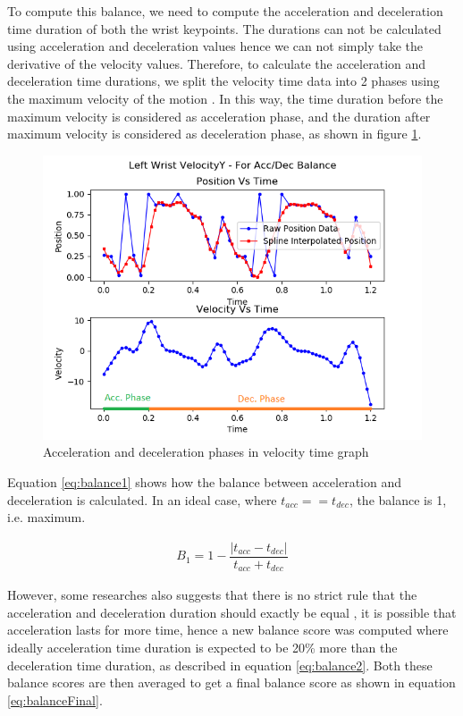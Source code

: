 To compute this balance, we need to compute the acceleration and deceleration time duration of both the wrist keypoints. The durations can not be calculated using acceleration and deceleration values hence we can not simply take the derivative of the velocity values. Therefore, to calculate the acceleration and deceleration time durations, we split the velocity time data into 2 phases using the maximum velocity of the motion \cite{scoringMultimodal}. In this way, the time duration before the maximum velocity is considered as acceleration phase, and the duration after maximum velocity is considered as deceleration phase, as shown in figure \ref{fig:accDectimes}.

\begin{figure}
    \centering
    \includegraphics[scale=1]{images/graphs/accDecPhase_Video5_good_LWrist.png}
    \caption{Acceleration and deceleration phases in velocity time graph}
    \label{fig:accDectimes}
\end{figure}

Equation \ref{eq:balance1} shows how the balance between acceleration and deceleration is calculated. In an ideal case, where $t_{acc} == t_{dec}$, the balance is 1, i.e. maximum. 

\begin{gather} 
  B_1 = 1 - \dfrac{|t_{acc} - t_{dec}|}{t_{acc} + t_{dec}}
  \label{eq:balance1}
\end{gather}

However, some researches also suggests that there is no strict rule that the acceleration and deceleration duration should exactly be equal \cite{movementQuality}, it is possible that acceleration lasts for more time, hence a new balance score was computed where ideally acceleration time duration is expected to be 20\% more than the deceleration time duration, as described in equation \ref{eq:balance2}. Both these balance scores are then averaged to get a final balance score as shown in equation \ref{eq:balanceFinal}. 

